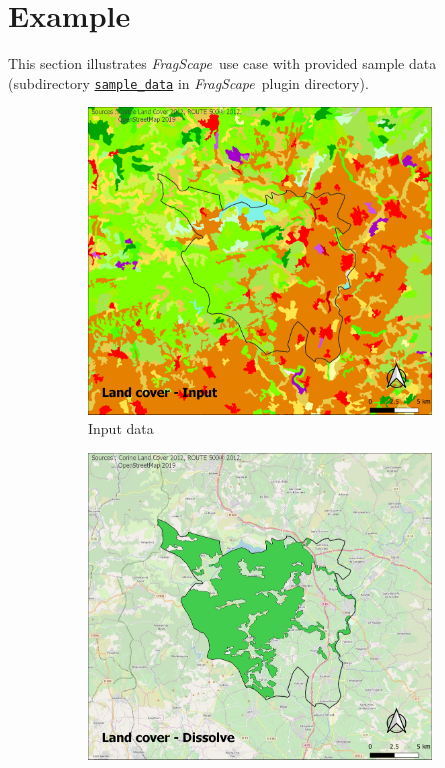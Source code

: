 \documentclass[11pt]{article}
\newcommand{\tool}{\emph{FragScape}}
\begin{document}
\pagebreak

\section{Example}

This section illustrates \tool\ use case with provided sample data (subdirectory \href{https://github.com/MathieuChailloux/FragScape/tree/master/sample_data/EPCI_Clermontais_2012}{\texttt{sample\_data}} in \tool\ plugin directory).

\begin{figure}[h!]
\centering
   \begin{subfigure}[b]{.48\textwidth}
      \includegraphics[width=\textwidth]{pictures/landuseInput.png}
      \caption{Input data}
   \end{subfigure}
   \begin{subfigure}[b]{.48\textwidth}
      \includegraphics[width=\textwidth]{pictures/landuseDissolve.png}

\end{subfigure}
\end{figure}
\end{document}

